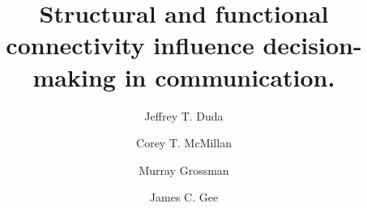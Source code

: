 \documentclass[final,authoryear,5p,times,twocolumn]{elsarticle}
\begin{document}
\begin{frontmatter}



\title{Structural and functional connectivity influence decision-making in communication.}


\author[BE]{Jeffrey T. Duda}
\author[Neu]{Corey T. McMillan}
\author[Neu]{Murray Grossman}
\author[Rad]{James C. Gee}
\address[BE]{University of Pennsylvania, Department of Bioengineering, Philadelphia, PA}
\address[Neu]{University of Pennsylvania Medical Center, Department of Neurology, Philadelphia, PA}
\address[Rad]{University of Pennsylvania Medical Center, Department of Radiology, Philadelphia, PA}


\end{frontmatter}
\end{document}
